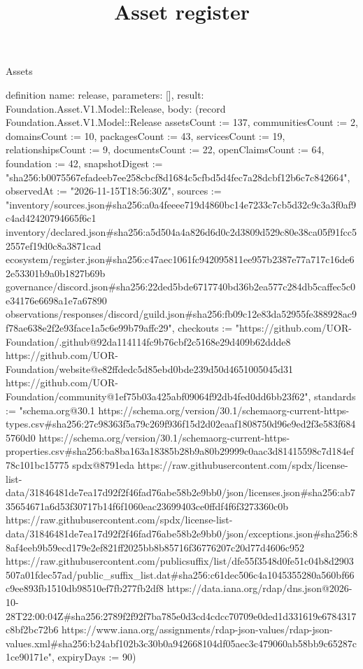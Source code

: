 \begin{lexlean}{Assets}
\title{Asset register}
\begin{semanticmodule}
definition{
  name: release,
  parameters: [],
  result: Foundation.Asset.V1.Model::Release,
  body: (record Foundation.Asset.V1.Model::Release {assetsCount := 137, communitiesCount := 2, domainsCount := 10, packagesCount := 43, servicesCount := 19, relationshipsCount := 9, documentsCount := 22, openClaimsCount := 64, foundation := 42, snapshotDigest := "sha256:b0075567efadeeb7ee258cbcf8d1684c5cfbd5d4fec7a28dcbf12b6c7c842664", observedAt := "2026-11-15T18:56:30Z", sources := "inventory/sources.json#sha256:a0a4feeee719d4860bc14e7233c7cb5d32c9c3a3f0af9c4ad42420794665f6c1 inventory/declared.json#sha256:a5d504a4a826d6d0c2d3809d529c80e38ca05f91fcc52557ef19d0c8a3871cad ecosystem/register.json#sha256:c47aec1061fc942095811ee957b2387e77a717c16de62e53301b9a0b1827b69b governance/discord.json#sha256:22ded5bde6717740bd36b2ea577c284db5caffec5c0e34176e6698a1e7a67890 observations/responses/discord/guild.json#sha256:fb09c12e83da52955fe388928ac9f78ae638e2f2e93face1a5c6e99b79affc29", checkouts := "https://github.com/UOR-Foundation/.github@92da114114fc9b76cbf2c5168e29d409b62ddde8 https://github.com/UOR-Foundation/website@e82ffdedc5d85ebd0bde239d50d4651005045d31 https://github.com/UOR-Foundation/community@1ef75b03a425abf09064f92db4fed0dd6bb23f62", standards := "schema.org@30.1 https://schema.org/version/30.1/schemaorg-current-https-types.csv#sha256:27c98363f5a79c269f936f15d2d02eaaf1808750d96e9ed2f3e583f6845760d0 https://schema.org/version/30.1/schemaorg-current-https-properties.csv#sha256:ba8ba163a18385b28b9a80b29999c0aac3d81415598c7d184ef78c101bc15775 spdx@8791eda https://raw.githubusercontent.com/spdx/license-list-data/31846481de7ea17d92f2f46fad76abe58b2e9bb0/json/licenses.json#sha256:ab735654671a6d53f30717b14f6f1060eac23699403ce0ffdf4f6f3273360c0b https://raw.githubusercontent.com/spdx/license-list-data/31846481de7ea17d92f2f46fad76abe58b2e9bb0/json/exceptions.json#sha256:88af4eeb9b59ecd179e2ef821ff2025bb8b85716f36776207c20d77d4606c952 https://raw.githubusercontent.com/publicsuffix/list/dfe55f3548d0fe51c04b8d2903507a01fdec57ad/public_suffix_list.dat#sha256:c61dec506c4a1045355280a560bf66c9ee893fb1510db98510ef7fb277fb2df8 https://data.iana.org/rdap/dns.json@2026-10-28T22:00:04Z#sha256:2789f2f92f7ba785e0d3cd4cdcc70709e0ded1d331619e6784317c8bf2bc72b6 https://www.iana.org/assignments/rdap-json-values/rdap-json-values.xml#sha256:b24abf102b3c30b0a942668104df05aec3c479060ab58bb9c65287c1ce90171e", expiryDays := 90})
}


\end{semanticmodule}
\end{lexlean}
